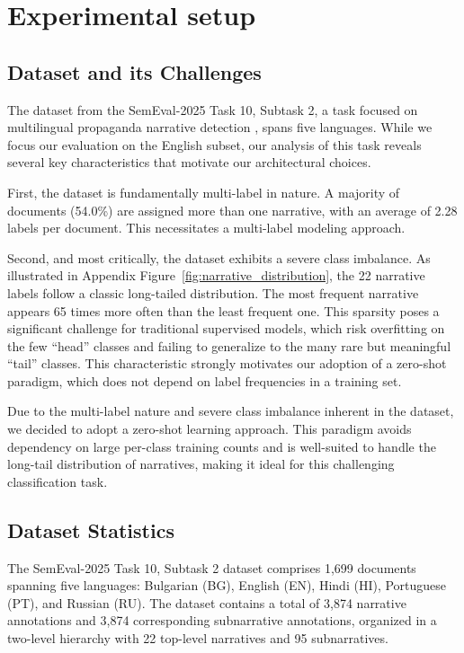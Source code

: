 \section{Experimental setup}

\subsection{Dataset and its Challenges}

The dataset from the SemEval-2025 Task 10, Subtask 2, a task focused on multilingual propaganda narrative detection \cite{semeval2025task10}, spans five languages. While we focus our evaluation on the English subset, our analysis of this task reveals several key characteristics that motivate our architectural choices.

First, the dataset is fundamentally multi-label in nature. A majority of documents (54.0\%) are assigned more than one narrative, with an average of 2.28 labels per document. This necessitates a multi-label modeling approach.

Second, and most critically, the dataset exhibits a severe class imbalance. As illustrated in Appendix Figure~\ref{fig:narrative_distribution}, the 22 narrative labels follow a classic long-tailed distribution. The most frequent narrative appears 65 times more often than the least frequent one. This sparsity poses a significant challenge for traditional supervised models, which risk overfitting on the few ``head'' classes and failing to generalize to the many rare but meaningful ``tail'' classes. This characteristic strongly motivates our adoption of a zero-shot paradigm, which does not depend on label frequencies in a training set.

Due to the multi-label nature and severe class imbalance inherent in the dataset, we decided to adopt a zero-shot learning approach. This paradigm avoids dependency on large per-class training counts and is well-suited to handle the long-tail distribution of narratives, making it ideal for this challenging classification task.

\subsection{Dataset Statistics}

The SemEval-2025 Task 10, Subtask 2 dataset comprises 1,699 documents spanning five languages: Bulgarian (BG), English (EN), Hindi (HI), Portuguese (PT), and Russian (RU). The dataset contains a total of 3,874 narrative annotations and 3,874 corresponding subnarrative annotations, organized in a two-level hierarchy with 22 top-level narratives and 95 subnarratives.

